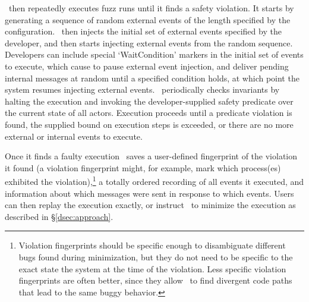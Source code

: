 \sys~then repeatedly executes fuzz runs until it finds a safety violation. It starts by
generating a sequence of random external events of the length specified by the configuration.
\sys~then injects the initial set of external events specified by the
developer, and then starts
injecting external events from the random sequence. Developers can include
special `WaitCondition' markers in the
initial set of events to execute, which cause \sys to pause
external event injection, and deliver pending internal
messages at random until a specified condition holds, at which point the
system resumes injecting external events. \sys~periodically checks invariants
by halting the execution and invoking the developer-supplied safety predicate over the current state
of all actors. Execution proceeds until a predicate violation is found, the supplied bound on execution steps
is exceeded, or there are no more external or internal events to execute.


Once it finds a faulty execution \sys~saves a user-defined fingerprint of the violation it
found (a violation fingerprint might, for example, mark which process(es)
exhibited the violation),\footnote{Violation fingerprints should
be specific enough to disambiguate different bugs found during minimization, but they do not need to be specific to
the exact state the system at the time of the violation. Less
specific violation fingerprints are often better, since they allow \sys~to
find divergent code paths that lead to the same buggy behavior.}
a totally ordered recording of all events it
executed, and information about which messages were sent in
response to which events. Users can then replay the execution exactly, or
instruct \sys~to minimize the execution as described in \S\ref{dsec:approach}.

